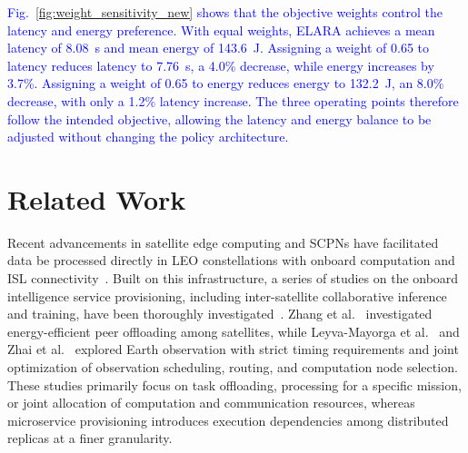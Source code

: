 \documentclass[10pt, conference, letterpaper]{IEEEtran}
\begin{document}

\textcolor{blue}{Fig.~\ref{fig:weight_sensitivity_new} shows that the objective weights control the latency and energy preference. With equal weights, ELARA achieves a mean latency of 8.08~s and mean energy of 143.6~J. Assigning a weight of 0.65 to latency reduces latency to 7.76~s, a 4.0\% decrease, while energy increases by 3.7\%. Assigning a weight of 0.65 to energy reduces energy to 132.2~J, an 8.0\% decrease, with only a 1.2\% latency increase. The three operating points therefore follow the intended objective, allowing the latency and energy balance to be adjusted without changing the policy architecture.}



\section{Related Work}
\label{sec:related_work}

Recent advancements in satellite edge computing and SCPNs have facilitated data be processed directly in LEO constellations with onboard computation and ISL connectivity~\cite{shi2025satellite,shen2023survey,xie2020stec}.
Built on this infrastructure, a series of studies on the onboard intelligence service provisioning, including inter-satellite collaborative inference and training, have been thoroughly investigated~\cite{sat_fed_finetune_twc2025,brain_decentralized_tmc2025,sai_lam_icc2025,lam_training_globecom2025}.
Zhang et al.~\cite{zhang2023sec_offloading} investigated energy-efficient peer offloading among satellites, while Leyva-Mayorga et al.~\cite{leyva2023satellite} and Zhai et al.~\cite{seco_infocom2024} explored Earth observation with strict timing requirements and joint optimization of observation scheduling, routing, and computation node selection. 
These studies primarily focus on task offloading, processing for a specific mission, or joint allocation of computation and communication resources, whereas microservice provisioning introduces execution dependencies among distributed replicas at a finer granularity.
\end{document}
